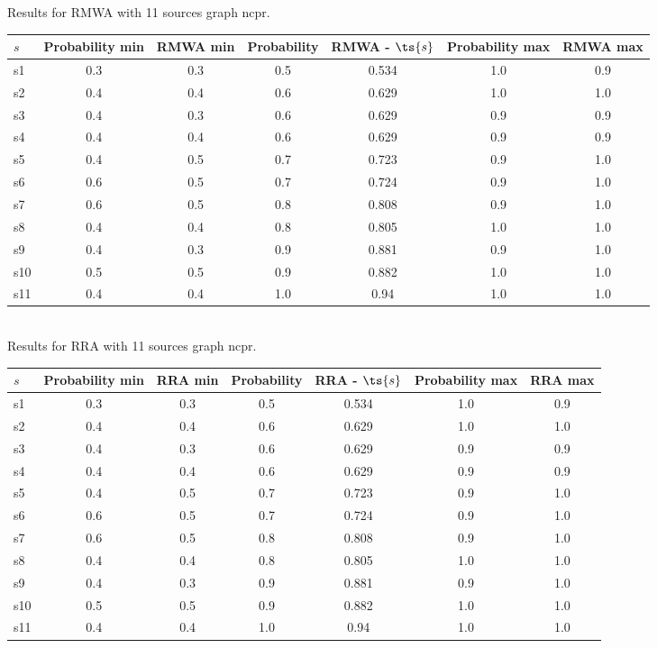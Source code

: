 \documentclass{article}
\begin{document}
\noindent Results for RMWA with 11 sources graph ncpr.

\noindent\begin{tabular}{|l|c|c|c|c|c|c|}
\hline
$s$& Probability min & RMWA min & Probability & RMWA - $\ts{s}$ & Probability max & RMWA max\\
\hline
s1 &0.3 & 0.3 & 0.5 & 0.534 & 1.0 & 0.9\\
\hline
s2 &0.4 & 0.4 & 0.6 & 0.629 & 1.0 & 1.0\\
\hline
s3 &0.4 & 0.3 & 0.6 & 0.629 & 0.9 & 0.9\\
\hline
s4 &0.4 & 0.4 & 0.6 & 0.629 & 0.9 & 0.9\\
\hline
s5 &0.4 & 0.5 & 0.7 & 0.723 & 0.9 & 1.0\\
\hline
s6 &0.6 & 0.5 & 0.7 & 0.724 & 0.9 & 1.0\\
\hline
s7 &0.6 & 0.5 & 0.8 & 0.808 & 0.9 & 1.0\\
\hline
s8 &0.4 & 0.4 & 0.8 & 0.805 & 1.0 & 1.0\\
\hline
s9 &0.4 & 0.3 & 0.9 & 0.881 & 0.9 & 1.0\\
\hline
s10 &0.5 & 0.5 & 0.9 & 0.882 & 1.0 & 1.0\\
\hline
s11 &0.4 & 0.4 & 1.0 & 0.94 & 1.0 & 1.0\\
\hline
\end{tabular}\\

\noindent Results for RRA with 11 sources graph ncpr.

\noindent\begin{tabular}{|l|c|c|c|c|c|c|}
\hline
$s$& Probability min & RRA min & Probability & RRA - $\ts{s}$ & Probability max & RRA max\\
\hline
s1 &0.3 & 0.3 & 0.5 & 0.534 & 1.0 & 0.9\\
\hline
s2 &0.4 & 0.4 & 0.6 & 0.629 & 1.0 & 1.0\\
\hline
s3 &0.4 & 0.3 & 0.6 & 0.629 & 0.9 & 0.9\\
\hline
s4 &0.4 & 0.4 & 0.6 & 0.629 & 0.9 & 0.9\\
\hline
s5 &0.4 & 0.5 & 0.7 & 0.723 & 0.9 & 1.0\\
\hline
s6 &0.6 & 0.5 & 0.7 & 0.724 & 0.9 & 1.0\\
\hline
s7 &0.6 & 0.5 & 0.8 & 0.808 & 0.9 & 1.0\\
\hline
s8 &0.4 & 0.4 & 0.8 & 0.805 & 1.0 & 1.0\\
\hline
s9 &0.4 & 0.3 & 0.9 & 0.881 & 0.9 & 1.0\\
\hline
s10 &0.5 & 0.5 & 0.9 & 0.882 & 1.0 & 1.0\\
\hline
s11 &0.4 & 0.4 & 1.0 & 0.94 & 1.0 & 1.0\\
\hline
\end{tabular}\\
\end{document}
